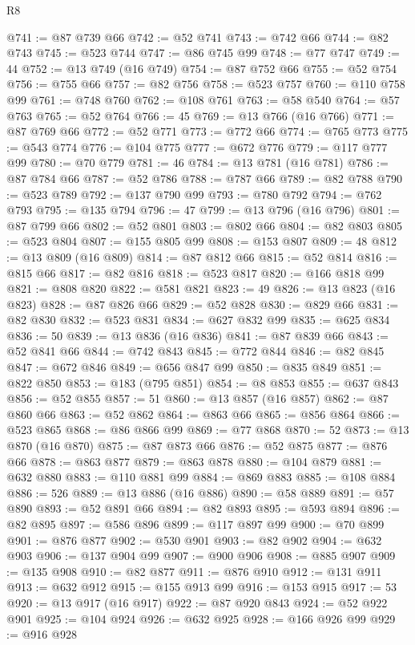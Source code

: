 \begin{lexlean}{R8}
\begin{coremodule}
@741 := @87 @739 @66
@742 := @52 @741
@743 := @742 @66
@744 := @82 @743
@745 := @523 @744
@747 := @86 @745 @99
@748 := @77 @747
@749 := 44
@752 := @13 @749 (@16 @749)
@754 := @87 @752 @66
@755 := @52 @754
@756 := @755 @66
@757 := @82 @756
@758 := @523 @757
@760 := @110 @758 @99
@761 := @748 @760
@762 := @108 @761
@763 := @58 @540
@764 := @57 @763
@765 := @52 @764
@766 := 45
@769 := @13 @766 (@16 @766)
@771 := @87 @769 @66
@772 := @52 @771
@773 := @772 @66
@774 := @765 @773
@775 := @543 @774
@776 := @104 @775
@777 := @672 @776
@779 := @117 @777 @99
@780 := @70 @779
@781 := 46
@784 := @13 @781 (@16 @781)
@786 := @87 @784 @66
@787 := @52 @786
@788 := @787 @66
@789 := @82 @788
@790 := @523 @789
@792 := @137 @790 @99
@793 := @780 @792
@794 := @762 @793
@795 := @135 @794
@796 := 47
@799 := @13 @796 (@16 @796)
@801 := @87 @799 @66
@802 := @52 @801
@803 := @802 @66
@804 := @82 @803
@805 := @523 @804
@807 := @155 @805 @99
@808 := @153 @807
@809 := 48
@812 := @13 @809 (@16 @809)
@814 := @87 @812 @66
@815 := @52 @814
@816 := @815 @66
@817 := @82 @816
@818 := @523 @817
@820 := @166 @818 @99
@821 := @808 @820
@822 := @581 @821
@823 := 49
@826 := @13 @823 (@16 @823)
@828 := @87 @826 @66
@829 := @52 @828
@830 := @829 @66
@831 := @82 @830
@832 := @523 @831
@834 := @627 @832 @99
@835 := @625 @834
@836 := 50
@839 := @13 @836 (@16 @836)
@841 := @87 @839 @66
@843 := @52 @841 @66
@844 := @742 @843
@845 := @772 @844
@846 := @82 @845
@847 := @672 @846
@849 := @656 @847 @99
@850 := @835 @849
@851 := @822 @850
@853 := @183 (@795 @851)
@854 := @8 @853
@855 := @637 @843
@856 := @52 @855
@857 := 51
@860 := @13 @857 (@16 @857)
@862 := @87 @860 @66
@863 := @52 @862
@864 := @863 @66
@865 := @856 @864
@866 := @523 @865
@868 := @86 @866 @99
@869 := @77 @868
@870 := 52
@873 := @13 @870 (@16 @870)
@875 := @87 @873 @66
@876 := @52 @875
@877 := @876 @66
@878 := @863 @877
@879 := @863 @878
@880 := @104 @879
@881 := @632 @880
@883 := @110 @881 @99
@884 := @869 @883
@885 := @108 @884
@886 := 526
@889 := @13 @886 (@16 @886)
@890 := @58 @889
@891 := @57 @890
@893 := @52 @891 @66
@894 := @82 @893
@895 := @593 @894
@896 := @82 @895
@897 := @586 @896
@899 := @117 @897 @99
@900 := @70 @899
@901 := @876 @877
@902 := @530 @901
@903 := @82 @902
@904 := @632 @903
@906 := @137 @904 @99
@907 := @900 @906
@908 := @885 @907
@909 := @135 @908
@910 := @82 @877
@911 := @876 @910
@912 := @131 @911
@913 := @632 @912
@915 := @155 @913 @99
@916 := @153 @915
@917 := 53
@920 := @13 @917 (@16 @917)
@922 := @87 @920 @843
@924 := @52 @922 @901
@925 := @104 @924
@926 := @632 @925
@928 := @166 @926 @99
@929 := @916 @928

\end{coremodule}
\end{lexlean}
